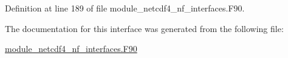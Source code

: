 Definition at line 189 of file module\+\_\+netcdf4\+\_\+nf\+\_\+interfaces.\+F90.



The documentation for this interface was generated from the following file\+:\begin{DoxyCompactItemize}
\item 
\hyperlink{module__netcdf4__nf__interfaces_8F90}{module\+\_\+netcdf4\+\_\+nf\+\_\+interfaces.\+F90}\end{DoxyCompactItemize}
